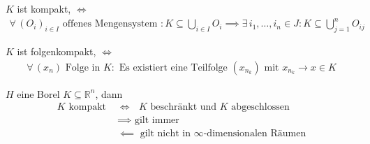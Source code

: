 \documentclass[a4paper,10pt]{scrbook}
\begin{document}
\begin{theorem*}[Definition]
  $K$ ist kompakt, $\iff$
  \begin{align*}
    \text{$\forall \, (O_i)_{i \in I}$ offenes Mengensystem } : K \subseteq \bigcup\limits_{i \in I} O_i \implies \exists \, i_1, \ldots, i_n \in J : K \subseteq \bigcup\limits_{j=1}^{n} O_{ij}
  \end{align*}

  $K$ ist folgenkompakt, $\iff$
  \begin{align*}
    \forall \, (x_n) \text{ Folge in } K : \text{ Es existiert eine Teilfolge } (x_{n_k}) \text{ mit } x_{n_k} \to x \in K
  \end{align*}

  $H$ eine Borel $K \subseteq \mathbb{R}^n$, dann
  \begin{align*}
    \text{$K$ kompakt }
    &\iff \text{ $K$ beschränkt und $K$ abgeschlossen} \\
    &\implies \text{ gilt immer} \\
    &\impliedby \text{ gilt nicht in $\infty$-dimensionalen Räumen}
  \end{align*}
\end{theorem*}
\end{document}
